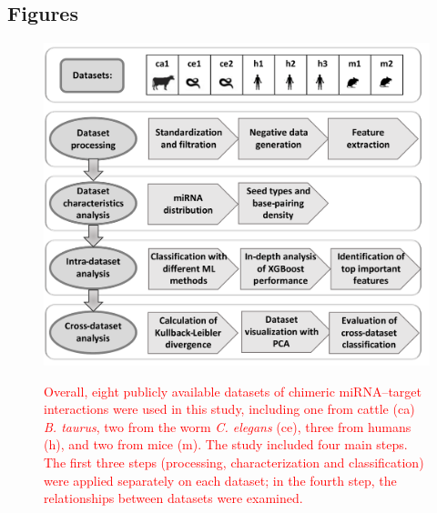\documentclass{bmcart}
\begin{document}
\begin{backmatter}
\section*{Figures}
\begin{figure}[h!]
  \caption{}
  \includegraphics[width=\textwidth]{0_flowchart.pdf}
  \label{fig:flowchart}
  \caption*{\textcolor{red}{Overall, eight publicly available datasets of chimeric miRNA--target interactions were used in this study, including one from cattle (ca) \textit{B. taurus}, two from the worm \textit{C. elegans} (ce), three from humans (h), and two from mice (m). The study included four main steps. The first three steps (processing, characterization and classification) were applied separately on each dataset; in the fourth step, the relationships between datasets were examined. }
  }
  \end{figure}






\end{backmatter}
\end{document}
